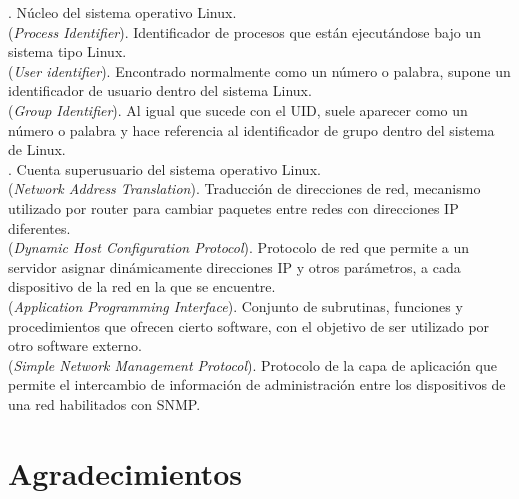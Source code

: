 \documentclass[a4paper, oneside, 12pt]{book}
\begin{document}
	. Núcleo del sistema operativo Linux.\\
		 
	 (\textit{Process Identifier}). Identificador de procesos que están ejecutándose bajo un sistema tipo Linux.\\
	
	 (\textit{User identifier}). Encontrado normalmente como un número o palabra, supone un identificador de usuario dentro del sistema Linux.\\
	
	 (\textit{Group Identifier}). Al igual que sucede con el UID, suele aparecer como un número o palabra y hace referencia al identificador de grupo dentro del sistema de Linux.\\
		 
	. Cuenta superusuario del sistema operativo Linux.\\
	
	 (\textit{Network Address Translation}). Traducción de direcciones de red, mecanismo utilizado por router para cambiar paquetes entre redes con direcciones IP diferentes.\\
	
	 (\textit{Dynamic Host Configuration Protocol}). Protocolo de red que permite a un servidor asignar dinámicamente direcciones IP y otros parámetros, a cada dispositivo de la red en la que se encuentre. \\
	
	 (\textit{Application Programming Interface}). Conjunto de subrutinas, funciones y procedimientos que ofrecen cierto software, con el objetivo de ser utilizado por otro software externo. \\
	
	 (\textit{Simple Network Management Protocol}). Protocolo de la capa de aplicación que permite el intercambio de información de administración entre los dispositivos de una red habilitados con SNMP.
		 
	
	\pagebreak
	
	\section*{Agradecimientos}
	\thispagestyle{plain}
	
\end{document}
